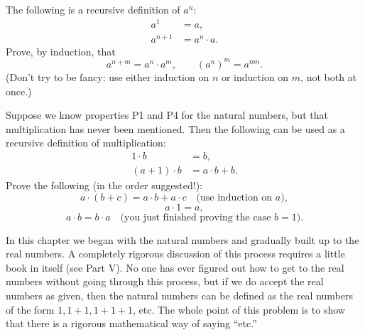  The following is a recursive definition of $a^n$:
\begin{align*}
a^1 &= a,\\
a^{n+1} &= a^n \cdot a.
\end{align*}
Prove, by induction, that
\[ a^{n+m} = a^n \cdot a^m, \qquad (a^n)^m = a^{nm}. \]
(Don't try to be fancy: use either induction on $n$ or induction on $m$, not
both at once.)

 Suppose we know properties P1 and P4 for the natural numbers, but
that multiplication has never been mentioned. Then the following can be used
as a recursive definition of multiplication:
\begin{align*}
1 \cdot b &= b,\\
(a+1) \cdot b &= a \cdot b + b.
\end{align*}
Prove the following (in the order suggested!):
\[
a \cdot (b+c) = a \cdot b + a \cdot c \quad\text{(use induction on }a\text{)},
\]
\[
a \cdot 1 = a,
\]
\[
a \cdot b = b \cdot a \quad\text{(you just finished proving the case }b=1\text{)}.
\]

 In this chapter we began with the natural numbers and gradually
built up to the real numbers. A completely rigorous discussion of this
process requires a little book in itself (see Part V). No one has ever
figured out how to get to the real numbers without going through this
process, but if we do accept the real numbers as given, then the natural
numbers can be defined as the real numbers of the form $1, 1+1, 1+1+1$, etc.
The whole point of this problem is to show that there is a rigorous
mathematical way of saying ``etc.''

